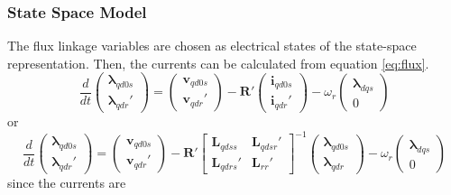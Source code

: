 \subsubsection{State Space Model}
The flux linkage variables are chosen as electrical states of the state-space representation. Then, the currents can be calculated from equation \ref{eq:flux}.
%
\begin{equation}
  \frac{d}{dt}
  \begin{pmatrix}
    \boldsymbol{\lambda}_{qd0s} \\
    \boldsymbol{\lambda}_{qdr}'
  \end{pmatrix}
  =
  \begin{pmatrix}
    \mathbf{v}_{qd0s} \\
    \mathbf{v}_{qdr}'
  \end{pmatrix}
  - \mathbf{R}'
  \begin{pmatrix}
    \mathbf{i}_{qd0s} \\
    \mathbf{i}_{qdr}'
  \end{pmatrix}
  - \omega_r
  \begin{pmatrix}
    \boldsymbol{\lambda}_{dqs} \\
    0
  \end{pmatrix}
\end{equation}
%
or
%
\begin{equation}
  \frac{d}{dt}
  \begin{pmatrix}
    \boldsymbol{\lambda}_{qd0s} \\
    \boldsymbol{\lambda}_{qdr}'
  \end{pmatrix}
  =
  \begin{pmatrix}
    \mathbf{v}_{qd0s} \\
    \mathbf{v}_{qdr}'
  \end{pmatrix}
  - \mathbf{R}'
  \begin{bmatrix}
    \mathbf{L}_{qdss} & \mathbf{L}_{qdsr}' \\
    \mathbf{L}_{qdrs}' & \mathbf{L}_{rr}'    
  \end{bmatrix}^{-1}
  \begin{pmatrix}
    \boldsymbol{\lambda}_{qd0s} \\
    \boldsymbol{\lambda}_{qdr}
  \end{pmatrix}  
    - \omega_r
  \begin{pmatrix}
    \boldsymbol{\lambda}_{dqs} \\
    0
  \end{pmatrix}
\end{equation}
%
since the currents are 
